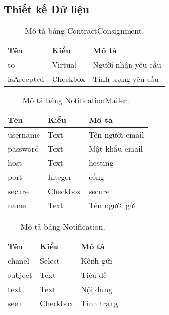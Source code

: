 \subsection{Thiết kế Dữ liệu}
\begin{table}[h!]
\begin{center}
	\caption{Mô tả bảng ContractConsignment.}
	\label{table:ContractConsignment}
	\begin{tabular}{ |l|l|l| } 
		\hline
		Tên & Kiểu & Mô tả \\
		\hline
		to & Virtual & Người nhận yêu cầu \\
	isAccepted & Checkbox & Tình trạng yêu cầu \\
		\hline
	\end{tabular}
\end{center}
\end{table}

\begin{table}[h!]
\begin{center}
	\caption{Mô tả bảng NotificationMailer.}
	\begin{tabular}{ |l|l|l| } 
	\hline
	Tên & Kiểu & Mô tả \\
	\hline
	username & Text & Tên người email \\
password & Text & Mật khẩu email \\
host & Text & hosting \\
port & Integer & cổng \\
secure & Checkbox & secure \\
name & Text & Tên người gửi \\ 
	\hline
\end{tabular}
	\label{table:NotificationMailer}
\end{center}
\end{table}


\begin{table}[h!]
\begin{center}
	\caption{Mô tả bảng Notification.}
	\begin{tabular}{ |l|l|l| } 
	\hline
	Tên & Kiểu & Mô tả \\
	\hline
	chanel & Select & Kênh gửi \\
subject & Text & Tiêu đề \\
text & Text & Nội dung \\
seen & Checkbox & Tình trạng \\ 
	\hline
\end{tabular}
	\label{table:Notification}
\end{center}
\end{table}


